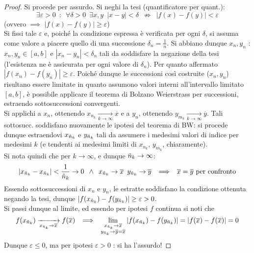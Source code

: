 \documentclass[10pt, oneside]{book}
\theoremstyle{plain}
\begin{document}
\begin{proof}
    Si procede per assurdo. Si neghi la tesi (quantificatore per quant.):
    \[\exists \varepsilon > 0 \enspace : \enspace \forall \delta > 0 \enspace \exists x,y \enspace |x-y|< \delta \enspace \nRightarrow \enspace |f(x) - f(y)| < \varepsilon\]
    (ovvero $\implies$ $|f(x) - f(y)| \geq \varepsilon$)
    \\Si fissi tale $\varepsilon$ e, poiché la condizione espressa è verificata per ogni $\delta$, si assuma come valore a piacere quello di una successione $\delta_n = \frac{1}{n}$. Si abbiano dunque $x_n, y_n$ : $x_n, y_n \in [a,b]$ e $|x_n - y_n| < \delta_n$ tali da soddisfare la negazione della tesi (l'esistenza ne è assicurata per ogni valore di $\delta_n$). Per quanto affermato $|f(x_n) - f(y_n)| \geq \varepsilon$. Poiché dunque le successioni così costruite ($x_n, y_n$) risultano essere limitate in quanto assumono valori interni all'intervallo limitato $[a,b]$, è possibile applicare il teorema di Bolzano Weierstrass per successioni, estraendo sottosuccessioni convergenti.
    \\Si applichi a $x_n$, ottenendo $x_{n_k} \xrightarrow[k \rightarrow \infty]{} \overline{x}$ e a $y_n$, ottenendo $y_{m_k} \xrightarrow[k \rightarrow \infty]{} \overline{y}$. Tali sottosucc. soddisfano nuovamente le ipotesi del teorema di BW: si procede dunque estraendovi $x_{\Tilde{n}_k}$ e $y_{\Tilde{n}_k}$ tali da assumere i medesimi valori di indice per medesimi $k$ (e tendenti ai medesimi limiti di $x_{n_k}$, $y_{m_k}$, chiaramente).
    \\Si nota quindi che per $k \rightarrow \infty$, e dunque $\Tilde{n}_k \rightarrow \infty$:
    \[|x_{\Tilde{n}_k} - x_{\Tilde{n}_k}| < \frac{1}{\Tilde{n}_k} \rightarrow 0 \enspace \land \enspace x_{\Tilde{n}_k} \rightarrow \overline{x} \enspace  y_{\Tilde{n}_k} \rightarrow \overline{y} \enspace \implies \enspace \overline{x} = \overline{y} \textrm{ per confronto}\]
    Essendo sottosuccessioni di $x_n$ e $y_n$, le estratte soddisfano la condizione ottenuta negando la tesi, dunque $|f(x_{\Tilde{n}_k}) - f(y_{\Tilde{n}_k})| \geq \varepsilon > 0$. 
    \\Si passi dunque al limite, ed essendo per ipotesi $f$ continua si noti che 
    \[f(x_{\Tilde{n}_k}) \xrightarrow[x_{\Tilde{n}_k} \rightarrow \overline{x}]{} f(\overline{x}) \enspace \implies \enspace \lim_{\substack{x_{\Tilde{n}_k} \rightarrow \overline{x} \\ y_{\Tilde{n}_k} \rightarrow \overline{y} = \overline{x}}} |f(x_{\Tilde{n}_k}) - f(y_{\Tilde{n}_k})| = |f(\overline{x}) - f(\overline{x})| = 0\]
    Dunque $\varepsilon \leq 0$, ma per ipotesi $\varepsilon > 0$ : si ha l'assurdo!
\end{proof}
\end{document}
